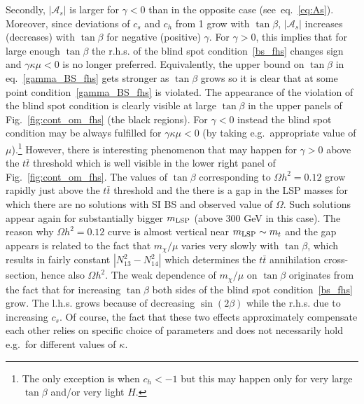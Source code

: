\documentclass[12pt,twoside]{article}
\begin{document}
Secondly,  $|\mathcal{A}_s|$ is larger for $\gamma<0$ than in the opposite case (see~eq.~\eqref{eq:As}). Moreover, since deviations of $c_s$ and $c_h$
from 1 grow with $\tan\beta$, $|\mathcal{A}_s|$ increases (decreases) with $\tan\beta$ for negative (positive) $\gamma$. For $\gamma>0$, this implies
that for large enough $\tan\beta$ the r.h.s. of the blind spot condition~\eqref{bs_fhs} changes sign and $\gamma\kappa\mu<0$ is no longer preferred.
Equivalently, the upper bound on $\tan\beta$ in eq.~\eqref{gamma_BS_fhs} gets stronger as $\tan\beta$ grows so it is clear that at some point
condition~\eqref{gamma_BS_fhs} is violated. The appearance of the violation of the blind spot condition is clearly visible at large $\tan\beta$ in
the upper panels of Fig.~\ref{fig:cont_om_fhs} (the black regions). For $\gamma<0$ instead the blind spot condition may be always fulfilled for
$\gamma\kappa\mu<0$ (by taking e.g.~appropriate value 
of $\mu$).\footnote{The 
only exception is when $c_h<-1$ but this may happen only for very large
$\tan\beta$ and/or very light $H$.}
However, there is interesting phenomenon that may happen for $\gamma>0$ above the $t\bar{t}$ threshold which is well visible in the lower right panel
of Fig.~\ref{fig:cont_om_fhs}. The values of $\tan\beta$ corresponding to $\Omega h^2=0.12$ grow rapidly just above the $t\bar{t}$ threshold and the
there is a gap in the LSP masses 
for which there are no solutions with SI BS and observed value of $\Omega$. 
Such solutions appear again for substantially bigger $m_{\rm LSP}$ (above 300 GeV in this case). The reason why $\Omega h^2=0.12$ curve is almost
vertical
near $m_{\rm LSP}\sim m_t$ and the gap appears is related to the fact that $m_\chi/\mu$ varies very slowly with $\tan\beta$, which results in fairly
constant $|N_{13}^2-N_{14}^2|$ which determines the $t\bar{t}$ annihilation cross-section, hence also $\Omega h^2$. The weak dependence of
$m_\chi/\mu$ on $\tan\beta$ originates from the fact that for increasing $\tan\beta$ both sides of the blind spot condition~\eqref{bs_fhs} grow. The
l.h.s. grows because of decreasing $\sin(2\beta)$ while the r.h.s. due to increasing $c_s$. Of course, the fact that these two effects approximately
compensate each other relies on specific choice of parameters and does not necessarily hold e.g.~for different values of $\kappa$.
\end{document}
